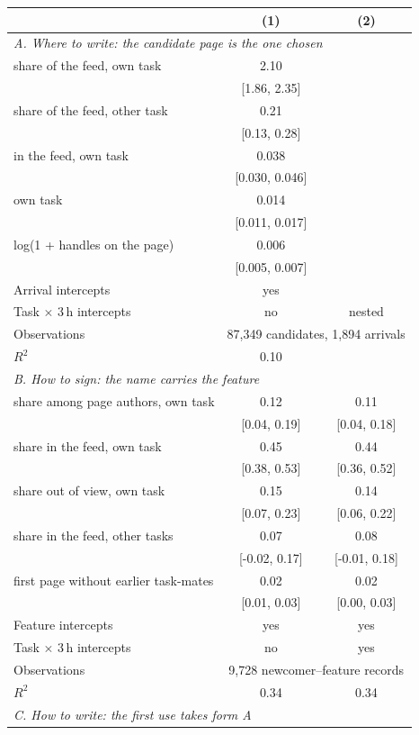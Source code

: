 \begin{tabular}{lcc}
\toprule
 & (1) & (2) \\
\midrule
\multicolumn{3}{l}{\textit{A. Where to write: the candidate page is the one chosen}} \\[2pt]
share of the feed, own task & 2.10 &  \\
 & [1.86, 2.35] &  \\
share of the feed, other task & 0.21 &  \\
 & [0.13, 0.28] &  \\
in the feed, own task & 0.038 &  \\
 & [0.030, 0.046] &  \\
own task & 0.014 &  \\
 & [0.011, 0.017] &  \\
log(1 + handles on the page) & 0.006 &  \\
 & [0.005, 0.007] &  \\
Arrival intercepts & yes &  \\
Task $\times$ 3\,h intercepts & no & nested \\
Observations & \multicolumn{2}{c}{87,349 candidates, 1,894 arrivals} \\
$R^2$ & 0.10 &  \\
\midrule
\multicolumn{3}{l}{\textit{B. How to sign: the name carries the feature}} \\[2pt]
share among page authors, own task & 0.12 & 0.11 \\
 & [0.04, 0.19] & [0.04, 0.18] \\
share in the feed, own task & 0.45 & 0.44 \\
 & [0.38, 0.53] & [0.36, 0.52] \\
share out of view, own task & 0.15 & 0.14 \\
 & [0.07, 0.23] & [0.06, 0.22] \\
share in the feed, other tasks & 0.07 & 0.08 \\
 & [-0.02, 0.17] & [-0.01, 0.18] \\
first page without earlier task-mates & 0.02 & 0.02 \\
 & [0.01, 0.03] & [0.00, 0.03] \\
Feature intercepts & yes & yes \\
Task $\times$ 3\,h intercepts & no & yes \\
Observations & \multicolumn{2}{c}{9,728 newcomer--feature records} \\
$R^2$ & 0.34 & 0.34 \\
\midrule
\multicolumn{3}{l}{\textit{C. How to write: the first use takes form A}} \\[2pt]

\end{tabular}
